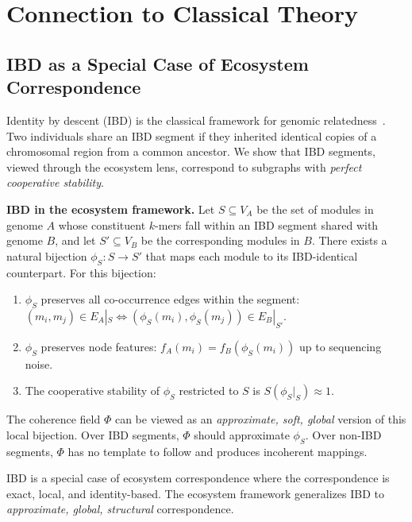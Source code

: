 \documentclass{../yalumba}
\begin{document}
\section{Connection to Classical Theory}
\label{sec:classical}

\subsection{IBD as a Special Case of Ecosystem Correspondence}
\label{sec:classical:ibd}

Identity by descent (IBD) is the classical framework for genomic
relatedness~\cite{browning2012ibd}.  Two individuals share an IBD
segment if they inherited identical copies of a chromosomal region from
a common ancestor.  We show that IBD segments, viewed through the
ecosystem lens, correspond to subgraphs with \emph{perfect cooperative
stability}.

\begin{definition}
\textbf{IBD in the ecosystem framework.}  Let $S \subseteq V_A$ be the
set of modules in genome $A$ whose constituent $k$-mers fall within an
IBD segment shared with genome $B$, and let $S' \subseteq V_B$ be the
corresponding modules in $B$.  There exists a natural bijection
$\phi_S: S \to S'$ that maps each module to its IBD-identical
counterpart.  For this bijection:
\begin{enumerate}
  \item $\phi_S$ preserves all co-occurrence edges within the segment:
    $(m_i, m_j) \in E_A|_S \iff (\phi_S(m_i), \phi_S(m_j)) \in
    E_B|_{S'}$.
  \item $\phi_S$ preserves node features: $f_A(m_i) = f_B(\phi_S(m_i))$
    up to sequencing noise.
  \item The cooperative stability of $\phi_S$ restricted to $S$ is
    $S(\phi_S|_S) \approx 1$.
\end{enumerate}
\end{definition}

The coherence field $\Phi$ can be viewed as an \emph{approximate,
soft, global} version of this local bijection.  Over IBD segments,
$\Phi$ should approximate $\phi_S$.  Over non-IBD segments, $\Phi$ has
no template to follow and produces incoherent mappings.

\begin{pullquote}
IBD is a special case of ecosystem correspondence where the
correspondence is exact, local, and identity-based.  The ecosystem
framework generalizes IBD to \emph{approximate, global, structural}
correspondence.
\end{pullquote}
\end{document}
